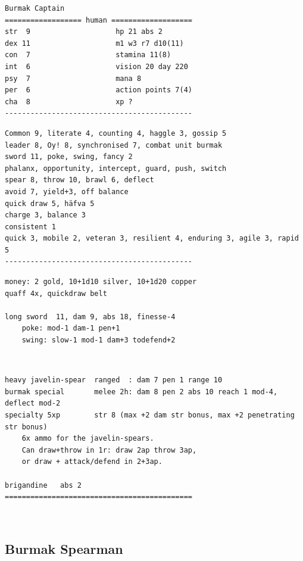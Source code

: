 \goodbreak \small \begin{samepage} \begin{verbatim}
Burmak Captain
================== human ===================
str  9                    hp 21 abs 2
dex 11                    m1 w3 r7 d10(11)
con  7                    stamina 11(8)
int  6                    vision 20 day 220
psy  7                    mana 8
per  6                    action points 7(4)
cha  8                    xp ?
--------------------------------------------
\end{verbatim} \end{samepage} \goodbreak \begin{samepage} \begin{verbatim}
Common 9, literate 4, counting 4, haggle 3, gossip 5
leader 8, Oy! 8, synchronised 7, combat unit burmak
sword 11, poke, swing, fancy 2
phalanx, opportunity, intercept, guard, push, switch
spear 8, throw 10, brawl 6, deflect
avoid 7, yield+3, off balance
quick draw 5, häfva 5
charge 3, balance 3
consistent 1
quick 3, mobile 2, veteran 3, resilient 4, enduring 3, agile 3, rapid 5
--------------------------------------------
\end{verbatim} \end{samepage} \goodbreak \begin{samepage} \begin{verbatim}
money: 2 gold, 10+1d10 silver, 10+1d20 copper
quaff 4x, quickdraw belt

long sword  11, dam 9, abs 18, finesse-4
    poke: mod-1 dam-1 pen+1
    swing: slow-1 mod-1 dam+3 todefend+2
\end{verbatim} \end{samepage}   \   \goodbreak \begin{samepage} \begin{verbatim}
heavy javelin-spear  ranged  : dam 7 pen 1 range 10
burmak special       melee 2h: dam 8 pen 2 abs 10 reach 1 mod-4, deflect mod-2
specialty 5xp        str 8 (max +2 dam str bonus, max +2 penetrating str bonus)
    6x ammo for the javelin-spears. 
    Can draw+throw in 1r: draw 2ap throw 3ap, 
    or draw + attack/defend in 2+3ap.

brigandine   abs 2
============================================
\end{verbatim} \end{samepage} \normalsize

\


\subsection*{Burmak Spearman}

